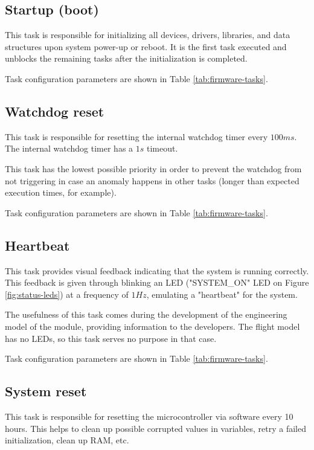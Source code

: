 \subsection{Startup (boot)}

This task is responsible for initializing all devices, drivers, libraries, and data structures upon system power-up or reboot.
It is the first task executed and unblocks the remaining tasks after the initialization is completed.

Task configuration parameters are shown in Table \ref{tab:firmware-tasks}.

\subsection{Watchdog reset}

This task is responsible for resetting the internal watchdog timer every \(100 ms\).
The internal watchdog timer has a \(1 s\) timeout.

This task has the lowest possible priority in order to prevent the watchdog from not triggering in case an anomaly happens in other tasks (longer than expected execution times, for example).

Task configuration parameters are shown in Table \ref{tab:firmware-tasks}.

\subsection{Heartbeat}

This task provides visual feedback indicating that the system is running correctly.
This feedback is given through blinking an LED ("SYSTEM\_ON" LED on Figure \ref{fig:status-leds}) at a frequency of \(1 Hz\), emulating a "heartbeat" for the system.

The usefulness of this task comes during the development of the engineering model of the module, providing information to the developers.
The flight model has no LEDs, so this task serves no purpose in that case. 

Task configuration parameters are shown in Table \ref{tab:firmware-tasks}.

\subsection{System reset}

This task is responsible for resetting the microcontroller via software every 10 hours.
This helps to clean up possible corrupted values in variables, retry a failed initialization, clean up RAM, etc.

